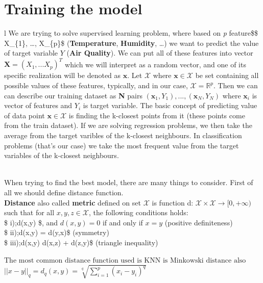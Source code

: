 \documentclass[
  letterpaper,
  DIV=11,
  numbers=noendperiod]{scrartcl}
\begin{document}
\section{Training the model}\label{training-the-model-1}

l We are trying to solve supervised learning problem, where based on
\emph{p} feature\$\$ X\_\{1\}, \ldots, X\_\{p\}\$ (\textbf{Temperature},
\textbf{Humidity}, \ldots) we want to predict the value of target
variable \(Y\) (\textbf{Air Quality}). We can put all of these features
into vector \(\textbf{X} = (X_{1}, ... X{_p})^T\) which we will
interpret as a random vector, and one of its specific realization will
be denoted as \(\mathbf{x}\). Let \(\mathcal{X}\) where
\(\textbf{x} \in \mathcal{X}\) be set containing all possible values of
these features, typically, and in our case,
\(\mathcal{X} = \mathbb{R}^p\). Then we can can describe our training
dataset as \textbf{N} pairs
\((\textbf{x}_{1}, Y_{1}), ..., (\textbf{x}_{N}, Y_{N})\) where
\(\textbf{x}_{i}\) is vector of features and \(Y_{i}\) is target
variable. The basic concept of predicting value of data point
\(\mathbf{x} \in \mathcal{X}\) is finding the k-closest points from it
(these points come from the train dataset). If we are solving regression
problems, we then take the average from the target varibles of the
k-closest neighbours. In classification problems (that's our case) we
take the most frequent value from the target variables of the k-closest
neighbours.\\
\strut \\
When trying to find the best model, there are many things to consider.
First of all we should define distance function.\\
\textbf{Distance} also called \textbf{metric} defined on set
\(\mathcal{X}\) is function d:
\(\mathcal{X} \times \mathcal{X} \rightarrow [0, +\infty)\) such that
for all \(x, y, z \in \mathcal{X}\), the following conditions holds:\\
\$ i);d(x,y) \$, and \(d(x,y) = 0\) if and only if \(x = y\)
(positive definiteness)\\
\$ ii);d(x,y) = d(y,x)\$ (symmetry)\\
\$ iii);d(x,y) \geq d(x,z) + d(z,y)\$ (triangle inequality)

\(\text{The most common distance function used is KNN is Minkowski distance also called q-norm defined as follows:}\)\\
\(||x-y||_{q} = d_{q}(x,y) = \sqrt[q]{\sum_{i=1}^{p} (x_i - y_i)^q}\)
\end{document}
